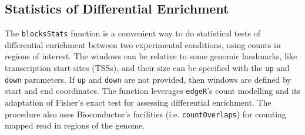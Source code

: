 \subsection{Statistics of Differential Enrichment}
The \texttt{blocksStats} function is a convenient way to do statistical tests of differential enrichment between two experimental conditions, using counts in regions of interest. The windows can be relative to some genomic landmarks, like transcription start sites (TSSs), and their size can be specified with the \texttt{up} and \texttt{down} parameters. If \texttt{up} and \texttt{down} are not provided, then windows are defined by start and end coordinates. The function leverages \texttt{edgeR}'s count modelling and its adaptation of Fisher's exact test for assessing differential enrichment.  The procedure also uses Bioconductor's facilities (i.e. \texttt{countOverlaps}) for counting mapped read in regions of the genome.

